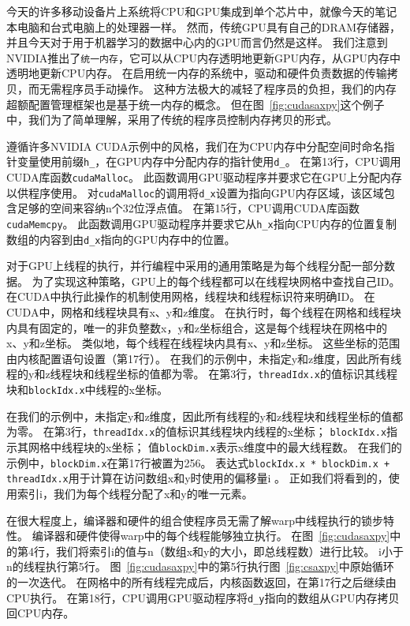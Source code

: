今天的许多移动设备片上系统将CPU和GPU集成到单个芯片中，就像今天的笔记本电脑和台式电脑上的处理器一样。 
然而，传统GPU具有自己的DRAM存储器，并且今天对于用于机器学习的数据中心内的GPU而言仍然是这样。 
我们注意到NVIDIA推出了\texttt{统一内存}，它可以从CPU内存透明地更新GPU内存，从GPU内存中透明地更新CPU内存。 
在启用统一内存的系统中，驱动和硬件负责数据的传输拷贝，而无需程序员手动操作。
这种方法极大的减轻了程序员的负担，我们的内存超额配置管理框架也是基于统一内存的概念。
但在图~\ref{fig:cudasaxpy}这个例子中，我们为了简单理解，采用了传统的程序员控制内存拷贝的形式。

遵循许多NVIDIA CUDA示例中的风格，我们在为CPU内存中分配空间时命名指针变量使用前缀\texttt{h\_}，在GPU内存中分配内存的指针使用\texttt{d\_}。 
在第13行，CPU调用CUDA库函数\texttt{cudaMalloc}。 
此函数调用GPU驱动程序并要求它在GPU上分配内存以供程序使用。 
对\texttt{cudaMalloc}的调用将\texttt{d\_x}设置为指向GPU内存区域，该区域包含足够的空间来容纳n个32位浮点值。 
在第15行，CPU调用CUDA库函数\texttt{cudaMemcpy}。 
此函数调用GPU驱动程序并要求它从\texttt{h\_x}指向CPU内存的位置复制数组的内容到由\texttt{d\_x}指向的GPU内存中的位置。

对于GPU上线程的执行，并行编程中采用的通用策略是为每个线程分配一部分数据。
为了实现这种策略，GPU上的每个线程都可以在线程块网格中查找自己ID。
在CUDA中执行此操作的机制使用网格，线程块和线程标识符来明确ID。
在CUDA中，网格和线程块具有x、y和z维度。
在执行时，每个线程在网格和线程块内具有固定的，唯一的非负整数x，y和z坐标组合，这是每个线程块在网格中的x、y和z坐标。
类似地，每个线程在线程块内具有x、y和z坐标。
这些坐标的范围由内核配置语句设置（第17行）。
在我们的示例中，未指定y和z维度，因此所有线程的y和z线程块和线程坐标的值都为零。
在第3行，\texttt{threadIdx.x}的值标识其线程块和\texttt{blockIdx.x}中线程的x坐标。

在我们的示例中，未指定y和z维度，因此所有线程的y和z线程块和线程坐标的值都为零。
在第3行，\texttt{threadIdx.x}的值标识其线程块内线程的x坐标；
\texttt{blockIdx.x}指示其网格中线程块的x坐标；
值\texttt{blockDim.x}表示x维度中的最大线程数。
在我们的示例中，\texttt{blockDim.x}在第17行被置为256。
表达式\texttt{blockIdx.x * blockDim.x + threadIdx.x}用于计算在访问数组x和y时使用的偏移量i 。
正如我们将看到的，使用索引i，我们为每个线程分配了x和y的唯一元素。

在很大程度上，编译器和硬件的组合使程序员无需了解warp中线程执行的锁步特性。 
编译器和硬件使得warp中的每个线程能够独立执行。 
在图~\ref{fig:cudasaxpy}中的第4行，我们将索引i的值与n（数组x和y的大小，即总线程数）进行比较。 
i小于n的线程执行第5行。
图~\ref{fig:cudasaxpy}中的第5行执行图~\ref{fig:csaxpy}中原始循环的一次迭代。 
在网格中的所有线程完成后，内核函数返回，在第17行之后继续由CPU执行。
在第18行，CPU调用GPU驱动程序将\texttt{d\_y}指向的数组从GPU内存拷贝回CPU内存。

